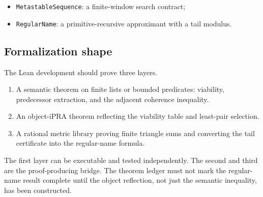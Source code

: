 \begin{itemize}
\item \texttt{MetastableSequence}: a finite-window search contract;
\item \texttt{RegularName}: a primitive-recursive approximant with a tail modulus.
\end{itemize}

\subsection{Formalization shape}

The Lean development should prove three layers.

\begin{enumerate}
\item A semantic theorem on finite lists or bounded predicates: viability, predecessor extraction, and the adjacent coherence inequality.
\item An object-iPRA theorem reflecting the viability table and least-pair selection.
\item A rational metric library proving finite triangle sums and converting the tail certificate into the regular-name formula.
\end{enumerate}

The first layer can be executable and tested independently.  The second and third are the proof-producing bridge.  The theorem ledger must not mark the regular-name result complete until the object reflection, not just the semantic inequality, has been constructed.
